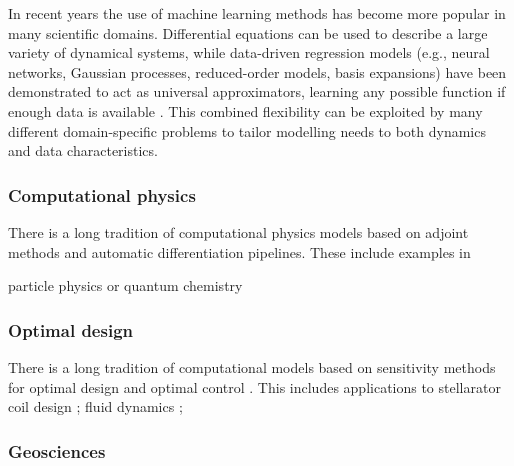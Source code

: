 In recent years the use of machine learning methods has become more popular in many scientific domains. 
Differential equations can be used to describe a large variety of dynamical systems, while data-driven regression models (e.g., neural networks, Gaussian processes, reduced-order models, basis expansions) have been demonstrated to act as universal approximators, learning any possible function if enough data is available \cite{gorban_1998}. 
This combined flexibility can be exploited by many different domain-specific problems to tailor modelling needs to both dynamics and data characteristics.

\subsubsection{Computational physics}

There is a long tradition of computational physics models based on adjoint methods and automatic differentiation pipelines. 
These include examples in 

particle physics \cite{Dorigo.2022} or quantum chemistry \cite{Arrazola.2021}

\subsubsection{Optimal design}

There is a long tradition of computational models based on sensitivity methods for optimal design and optimal control \cite{lions1971optimal, pironneau2005optimal, allaire2014shape}.
This includes applications to 
stellarator coil design \cite{McGreivy_stellarator_2021}; 
fluid dynamics \cite{Giles_Pierce_2000, mohammadi2009applied};



\subsubsection{Geosciences}

